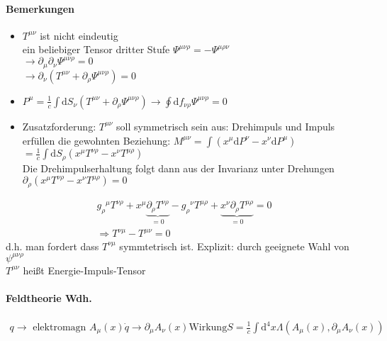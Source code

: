 \documentclass[a4paper]{article}
\begin{document}
\paragraph{Bemerkungen}
\begin{itemize}
  \item $T^{\mu\nu}$ ist nicht eindeutig \\ ein beliebiger Tensor dritter Stufe
  $\Psi^{\mu\nu\rho}=-\Psi^{\mu\rho\nu}$\\ $\rightarrow
  \partial_\mu\partial_\nu\Psi^{\mu\nu\rho}=0$\\$\rightarrow
  \partial_\nu(T^{\mu\nu}+\partial_\rho \Psi^{\mu\nu\rho} )=0$
  \item $P^\mu=\frac{1}{c}\int \mathrm{d}S_\nu \left( T^{\mu\nu}+\partial_\rho
  \Psi^{\mu\nu\rho} \right)\rightarrow \oint \mathrm{d}f_{\nu\rho} \Psi^{\mu\nu\rho}=0 $
  \item Zusatzforderung: $T^{\mu\nu}$ soll symmetrisch sein aus: Drehimpuls und
  Impuls erfüllen die gewohnten Beziehung: $M^{\mu\nu}=\int\left( x^\mu
  \mathrm{d}P^\nu-x^\nu \mathrm{d}P^\mu \right)$\\$=\frac{1}{c}\int \mathrm{d}S_\rho\left( x^\mu
  T^{\nu\rho}-x^\nu T^{\mu\rho} \right)$\\ Die Drehimpulserhaltung folgt dann
  aus der Invarianz unter Drehungen\\ $\partial_\rho\left( x^\mu
  T^{\nu\rho}-x^\nu T^{\mu\rho} \right)=0$
\end{itemize}
\begin{align}
g_\rho{}^\mu T^{\nu\rho}+x^\mu \underbrace{\partial_\rho
T^{\nu\rho}}_{=0}-g_\rho{}^\nu T^{\mu\rho}+\underbrace{x^\nu \partial_\rho
T^{\mu\rho}}_{=0}=0\\
\Rightarrow T^{\nu\mu}-T^{\mu\nu}=0
\end{align}
d.h. man fordert dass $T^{\nu\mu}$ symmtetrisch ist. Explizit: durch
geeignete Wahl von $\psi^{\mu\nu\rho}$ \\
$T^{\mu\nu}$ heißt Energie-Impuls-Tensor

\paragraph{Feldtheorie Wdh.}
\begin{align}
q\rightarrow \text{ elektromagn } A_\mu(x)
\dot{q} \rightarrow \partial_\mu A_\nu(x)
\text{Wirkung} S=\frac{1}{c}\int \mathrm{d}^4x \Lambda(A_\mu(x),\partial_\mu
A_\nu(x))
\end{align}
\end{document}
